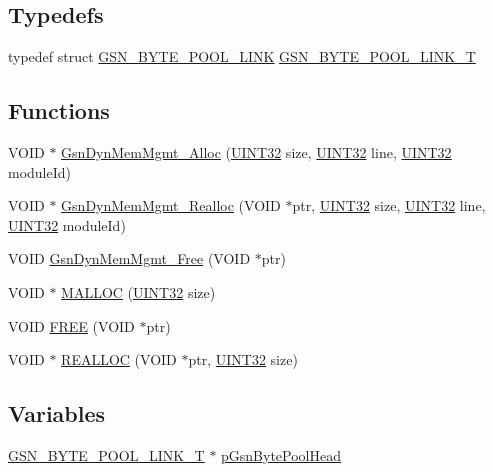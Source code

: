 \subsection*{Typedefs}
\begin{DoxyCompactItemize}
\item 
typedef struct \hyperlink{a00035}{GSN\_\-BYTE\_\-POOL\_\-LINK} \hyperlink{a00470_a43b2d3e37533f60e9239424355b31657}{GSN\_\-BYTE\_\-POOL\_\-LINK\_\-T}
\end{DoxyCompactItemize}
\subsection*{Functions}
\begin{DoxyCompactItemize}
\item 
VOID $\ast$ \hyperlink{a00470_ab7f4aadf548c474e7be54a6d848f527d}{GsnDynMemMgmt\_\-Alloc} (\hyperlink{a00660_gae1e6edbbc26d6fbc71a90190d0266018}{UINT32} size, \hyperlink{a00660_gae1e6edbbc26d6fbc71a90190d0266018}{UINT32} line, \hyperlink{a00660_gae1e6edbbc26d6fbc71a90190d0266018}{UINT32} moduleId)
\item 
VOID $\ast$ \hyperlink{a00470_a64c59f6321ca5ca6d95b4bd19549be90}{GsnDynMemMgmt\_\-Realloc} (VOID $\ast$ptr, \hyperlink{a00660_gae1e6edbbc26d6fbc71a90190d0266018}{UINT32} size, \hyperlink{a00660_gae1e6edbbc26d6fbc71a90190d0266018}{UINT32} line, \hyperlink{a00660_gae1e6edbbc26d6fbc71a90190d0266018}{UINT32} moduleId)
\item 
VOID \hyperlink{a00470_a00b4ea05aecdc09e911f8f4813fbbf3b}{GsnDynMemMgmt\_\-Free} (VOID $\ast$ptr)
\item 
VOID $\ast$ \hyperlink{a00470_a33e51d4c3afec183b9c99627ed611042}{MALLOC} (\hyperlink{a00660_gae1e6edbbc26d6fbc71a90190d0266018}{UINT32} size)
\item 
VOID \hyperlink{a00470_a8817fa41dc629062cdbef1c4c54e94d5}{FREE} (VOID $\ast$ptr)
\item 
VOID $\ast$ \hyperlink{a00470_a1a2790c07ecfa45ad9bfc1c0412aad0d}{REALLOC} (VOID $\ast$ptr, \hyperlink{a00660_gae1e6edbbc26d6fbc71a90190d0266018}{UINT32} size)
\end{DoxyCompactItemize}
\subsection*{Variables}
\begin{DoxyCompactItemize}
\item 
\hyperlink{a00035}{GSN\_\-BYTE\_\-POOL\_\-LINK\_\-T} $\ast$ \hyperlink{a00470_a959cb89a34782abb9c1de0f395d34f39}{pGsnBytePoolHead}
\end{DoxyCompactItemize}


